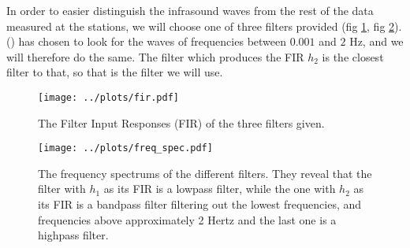 \documentclass[11pt, a4paper]{article}
\begin{document}
In order to easier distinguish the infrasound waves from the rest of the data measured at the stations, we will choose one of three filters provided (fig \ref{fig:fir}, fig \ref{fig:freq_spec}). (\cite{nhess}) has chosen to look for the waves of frequencies between $0.001$ and $2$ Hz, and we will therefore do the same. The filter which produces the FIR $h_2$ is the closest filter to that, so that is the filter we will use.

\begin{figure}
\texttt{[image: ../plots/fir.pdf]}
\caption{The Filter Input Responses (FIR) of the three filters given.}
\label{fig:fir}
\end{figure}

\begin{figure}
\texttt{[image: ../plots/freq\_spec.pdf]}
\caption{The frequency spectrums of the different filters. They reveal that the filter with $h_1$ as its FIR is a lowpass filter, while the one with $h_2$ as its FIR is a bandpass filter filtering out the lowest frequencies, and frequencies above approximately 2 Hertz and the last one is a highpass filter.}
\label{fig:freq_spec}
\end{figure}
\end{document}
